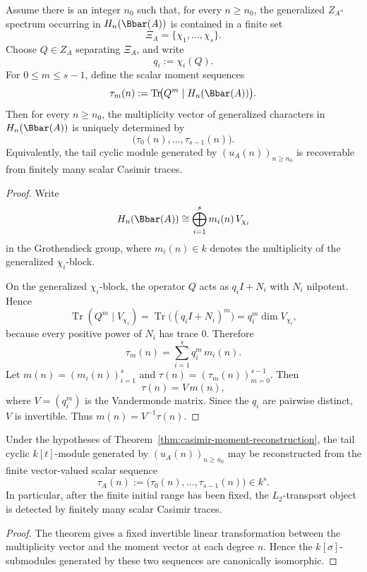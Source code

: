 \begin{theorem}
\label{thm:casimir-moment-reconstruction}
Assume there is an integer \(n_0\) such that, for every \(n\ge n_0\), the generalized
\(Z_A\)-spectrum occurring in \(H_n(\Bbar(A))\) is contained in a finite set
\[
\Xi_A=\{\chi_1,\dots,\chi_s\}.
\]
Choose \(Q\in Z_A\) separating \(\Xi_A\), and write
\[
q_i:=\chi_i(Q).
\]
For \(0\le m\le s-1\), define the scalar moment sequences
\[
\tau_m(n):=\operatorname{Tr}\!\bigl(Q^m\mid H_n(\Bbar(A))\bigr).
\]
Then for every \(n\ge n_0\), the multiplicity vector of generalized characters in \(H_n(\Bbar(A))\) is uniquely determined by
\[
\bigl(\tau_0(n),\dots,\tau_{s-1}(n)\bigr).
\]
Equivalently, the tail cyclic module generated by \((u_A(n))_{n\ge n_0}\) is recoverable from finitely many scalar Casimir traces.
\end{theorem}

\begin{proof}
Write
\[
H_n(\Bbar(A))\cong \bigoplus_{i=1}^s m_i(n)\,V_{\chi_i}
\]
in the Grothendieck group, where \(m_i(n)\in k\) denotes the multiplicity of the generalized \(\chi_i\)-block.

On the generalized \(\chi_i\)-block, the operator \(Q\) acts as \(q_i I + N_i\) with \(N_i\) nilpotent.
Hence
\[
\operatorname{Tr}(Q^m\mid V_{\chi_i})
=\operatorname{Tr}\bigl((q_iI+N_i)^m\bigr)
= q_i^m \dim V_{\chi_i},
\]
because every positive power of \(N_i\) has trace \(0\).
Therefore
\[
\tau_m(n)=\sum_{i=1}^s q_i^m\,m_i(n).
\]
Let \(m(n)=(m_i(n))_{i=1}^s\) and \(\tau(n)=(\tau_m(n))_{m=0}^{s-1}\).
Then
\[
\tau(n)=V\,m(n),
\]
where \(V=(q_i^m)\) is the Vandermonde matrix.
Since the \(q_i\) are pairwise distinct, \(V\) is invertible.
Thus \(m(n)=V^{-1}\tau(n)\).
\end{proof}

\begin{corollary}
\label{cor:finite-scalar-probes}
Under the hypotheses of Theorem~\ref{thm:casimir-moment-reconstruction}, the tail cyclic \(k[t]\)-module generated by \((u_A(n))_{n\ge n_0}\) may be reconstructed from the finite vector-valued scalar sequence
\[
\tau_A(n):=\bigl(\tau_0(n),\dots,\tau_{s-1}(n)\bigr)\in k^s.
\]
In particular, after the finite initial range has been fixed, the \(L_2\)-transport object is detected by finitely many scalar Casimir traces.
\end{corollary}

\begin{proof}
The theorem gives a fixed invertible linear transformation between the multiplicity vector and the moment vector at each degree \(n\).
Hence the \(k[\sigma]\)-submodules generated by these two sequences are canonically isomorphic.
\end{proof}

